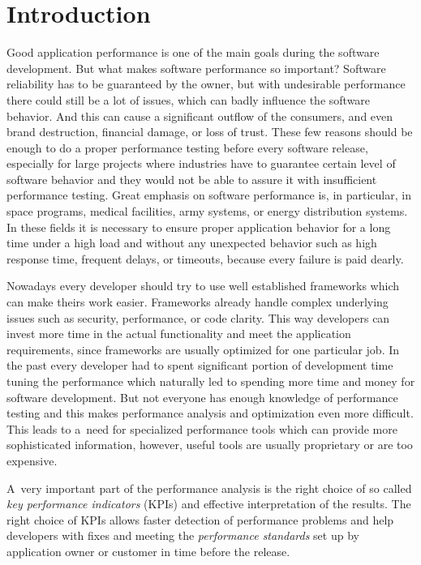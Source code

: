 


\chapter{Introduction}
\label{Introduction}
Good application performance is one of the main goals during the software development. But what makes software performance so important? Software reliability has to be guaranteed by the owner, but with undesirable performance there could still be a lot of issues, which can badly influence the software behavior. And this can cause a significant outflow of the consumers, and even brand destruction, financial damage, or loss of trust. These few reasons should be enough to do a proper performance testing before every software release, especially for large projects where industries have to guarantee certain level of software behavior and they would not be able to assure it with insufficient performance testing. Great emphasis on software performance is, in particular, in space programs, medical facilities, army systems, or energy distribution systems. In these fields it is necessary to ensure proper application behavior for a long time under a high load and without any unexpected behavior such as high response time, frequent delays, or timeouts, because every failure is paid dearly.

Nowadays every developer should try to use well established frameworks which can make theirs work easier. Frameworks already handle complex underlying issues such as security, performance, or code clarity. This way developers can invest more time in the actual functionality and meet the application requirements, since frameworks are usually optimized for one particular job. In the past every developer had to spent significant portion of development time tuning the performance which naturally led to spending more time and money for software development. But not everyone has enough knowledge of performance testing and this makes performance analysis and optimization even more difficult. This leads to a~need for specialized performance tools which can provide more sophisticated information, however, useful tools are usually proprietary or are too expensive.

A~very important part of the performance analysis is the right choice of so called \emph{key performance indicators} (KPIs) \cite{Molyneaux:TAoAPT} and effective interpretation of the results. The right choice of KPIs allows faster detection of performance problems and help developers with fixes and meeting the \emph{performance standards} \cite{Molyneaux:TAoAPT} set up by application owner or customer in time before the release.

